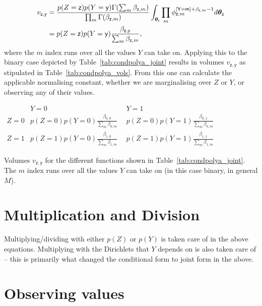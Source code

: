 \documentclass[oneside,english]{scrbook}
\begin{document}
\begin{align}
  v_{\mathsf{z,y}}
  &= \frac{p(Z=\mathsf{z})p(Y=\mathsf{y})\Gamma(\sum_m\beta_{\mathsf{z},m}) }{\prod_{m}\Gamma(\beta_{\mathsf{z},m})} \int_{\bm{\theta}_{\mathsf{z}}} \prod_m\phi_{\mathsf{z},m}^{[\mathsf{Y=m}]+\beta_{\mathsf{z},m}-1} d\bm{\theta}_{\mathsf{z}} \notag\\
  &= p(Z=\mathsf{z})p(Y=\mathsf{y})\frac{\beta_{\mathsf{z,y}}}{\sum_m\beta_{\mathsf{z},m}}, \label{eq:condpolya_vols}
\end{align}
where the $m$ index runs over all the values $Y$ can take on. Applying
this to the binary case depicted by Table~\ref{tab:condpolya_joint}
results in volumes $v_{\mathsf{z,y}}$ as stipulated in
Table~\ref{tab:condpolya_vols}. From this one can calculate the
applicable normalising constant, whether we are marginalising over $Z$
or $Y$, or observing any of their values.
\begin{table}[!h]
  \begin{center}
    \(
    \renewcommand{\arraystretch}{1.5}
    \begin{array}{l|cc}
      & Y=0 & Y=1 \\ \hline
      Z=0 & p(Z=0)p(Y=0) \frac{\beta_{0,0}}{\sum_m\beta_{0,m}}~~ & p(Z=0)p(Y=1) \frac{\beta_{0,1}}{\sum_m\beta_{0,m}}\\
      Z=1 & p(Z=1)p(Y=0) \frac{\beta_{1,0}}{\sum_m\beta_{1,m}}~~ & p(Z=1)p(Y=1) \frac{\beta_{1,1}}{\sum_m\beta_{1,m}}
    \end{array}
    \)
  \end{center}
  \caption{Volumes $v_{\mathsf{z,y}}$ for the different functions
    shown in Table~\ref{tab:condpolya_joint}. The $m$ index runs over
    all the values $Y$ can take on (in this case binary, in general
    $M$). \label{tab:condpolya_vols} }
\end{table}

\section{Multiplication and Division}
Multiplying/dividing with either $p(Z)$ or $p(Y)$ is taken care of in
the above equations. Multiplying with the Dirichlets that $Y$ depends
on is also taken care of -- this is primarily what changed the
conditional form to joint form in the above.

\section{Observing values}
\end{document}
